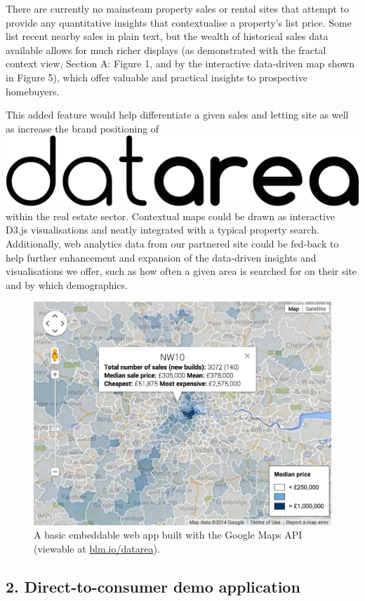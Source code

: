 \documentclass[
10pt, %
a4paper, %
oneside, %
headinclude,footinclude, %
BCOR5mm, %
]{scrartcl}
\newcommand*{\logo}{\includegraphics[scale=.04]{Figures/logotext.png}}
\begin{document}
There are currently no mainsteam property sales or rental sites that
attempt to provide any quantitative insights that contextualise a
property's list price. Some list recent nearby sales in plain text,
but the wealth of historical sales data available allows for much
richer displays (as demonstrated with the fractal context view,
Section A: Figure 1, and by the interactive data-driven map shown in
Figure 5), which offer valuable and practical insights to prospective
homebuyers.

This added feature would help differentiate a given sales and letting
site as well as increase the brand positioning of \logo\hspace{.1em}
within the real estate sector. Contextual maps could be drawn as
interactive D3.js visualisations and neatly integrated with a typical
property search. Additionally, web analytics data from our partnered
site could be fed-back to help further enhancement and expansion of
the data-driven insights and visualisations we offer, such as how
often a given area is searched for on their site and by which
demographics.

\begin{figure}[h]
\vspace{1.5em}
\centering
\includegraphics[width=.85\textwidth]{Figures/gmapScreenshot.png}
\vspace{.5em}
\caption{ A basic embeddable web app built with the Google Maps API
  (viewable at \href{http://blm.io/datarea}{blm.io/datarea}). }
\end{figure}

\subsection*{2. Direct-to-consumer demo application}
\end{document}
